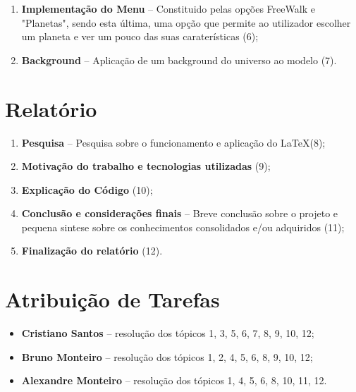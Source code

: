 \begin{enumerate}
    \item \textbf{Implementação do Menu} -- Constituido pelas opções FreeWalk e "Planetas", sendo esta última, uma opção que permite ao utilizador escolher um planeta e ver um pouco das suas caraterísticas (6);
    \item \textbf{Background} -- Aplicação de um background do universo ao modelo (7).
\end{enumerate}


\section{Relatório}
\label{chap3:sec:concs}

\begin{enumerate}
    \item \textbf{Pesquisa} -- Pesquisa sobre o funcionamento e aplicação do \LaTeX (8);
    \item \textbf{Motivação do trabalho e tecnologias utilizadas} (9);
    \item \textbf{Explicação do Código} (10);
    \item \textbf{Conclusão e considerações finais} -- Breve conclusão sobre o projeto e pequena sintese sobre os conhecimentos consolidados e/ou adquiridos (11);
    \item \textbf{Finalização do relatório} (12).
\end{enumerate}

\section{Atribuição de Tarefas}

\begin{itemize}
    \item \textbf{Cristiano Santos} --  resolução dos tópicos 1, 3, 5, 6, 7, 8, 9, 10, 12;
    \item \textbf{Bruno Monteiro} -- resolução dos tópicos 1, 2, 4, 5, 6, 8, 9, 10, 12;
    \item \textbf{Alexandre Monteiro} -- resolução  dos tópicos 1, 4, 5, 6, 8, 10, 11, 12.
\end{itemize}

